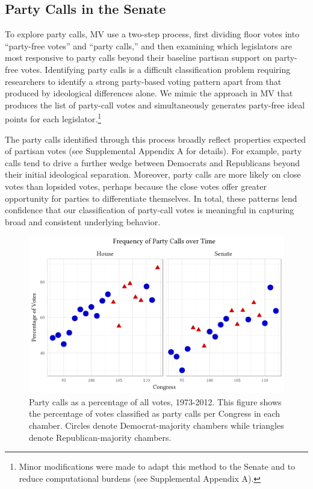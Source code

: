 \documentclass[12pt]{article}
\begin{document}
\subsection*{Party Calls in the Senate}

To explore party calls, MV use a two-step process, first dividing floor votes into ``party-free votes'' and ``party calls,'' and then examining which legislators are most responsive to party calls beyond their baseline partisan support on party-free votes.  Identifying party calls is a difficult classification problem requiring researchers to identify a strong party-based voting pattern apart from that produced by ideological differences alone.  We mimic the approach in MV that produces the list of party-call votes and simultaneously generates party-free ideal points for each legislator.\footnote{\doublespacing\normalsize Minor modifications were made to adapt this method to the Senate and to reduce computational burdens (see Supplemental Appendix A).}

The party calls identified through this process broadly reflect properties expected of partisan votes (see Supplemental Appendix A for details).  For example, party calls tend to drive a further wedge between Democrats and Republicans beyond their initial ideological separation.  Moreover, party calls are more likely on close votes than lopsided votes, perhaps because the close votes offer greater opportunity for parties to differentiate themselves.  In total, these patterns lend confidence that our classification of party-call votes is meaningful in capturing broad and consistent underlying behavior.

\begin{figure}[t]
\centering
\includegraphics{party-calls-over-time.pdf}
\caption{Party calls as a percentage of all votes, 1973-2012.
This figure shows the percentage of votes classified as party calls per Congress in each chamber. Circles denote Democrat-majority chambers while triangles denote Republican-majority chambers.
\label{fig-party-calls-over-time}}
\end{figure}
\end{document}
